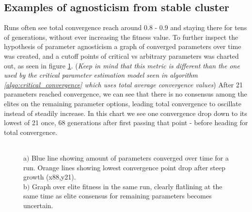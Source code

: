\documentclass[a4paper,english]{report}
\begin{document}
		\subsection{Examples of agnosticism from stable cluster }
		\label{sec:agnosstable}
		Runs often see total convergence reach around 0.8 - 0.9  and staying there for tens of generations, without ever increasing the fitness value. To further inspect the hypothesis of parameter agnosticism a graph of converged parameters over time was created, and a cutoff points of critical vs arbitrary parameters was charted out, as seen in figure \ref{fig:agnos}. (\textit{Keep in mind that this metric is different than the one used by the critical parameter estimation model seen in algorithm \ref{algo:critical_convergence} which uses total average convergence values}) After 21 parameters reached convergence, we can see that there is no consensus among the elites on the remaining parameter options, leading total convergence to oscillate instead of steadily increase. In this chart we see one convergence drop down to its lowest of 21 once, 68 generations after first passing that point - before heading for total convergence.
		\begin{figure}[H]
			\centering
			\qquad
			\caption{\\a$)$ Blue line showing amount of parameters converged over time for a run. Orange lines showing lowest convergence point drop after steep growth (x88,y21).\\b$)$ Graph over elite fitness in the same run, clearly flatlining at the same time as elite consensus for remaining parameters becomes uncertain.}
			\label{fig:agnos}
		\end{figure}
\end{document}
